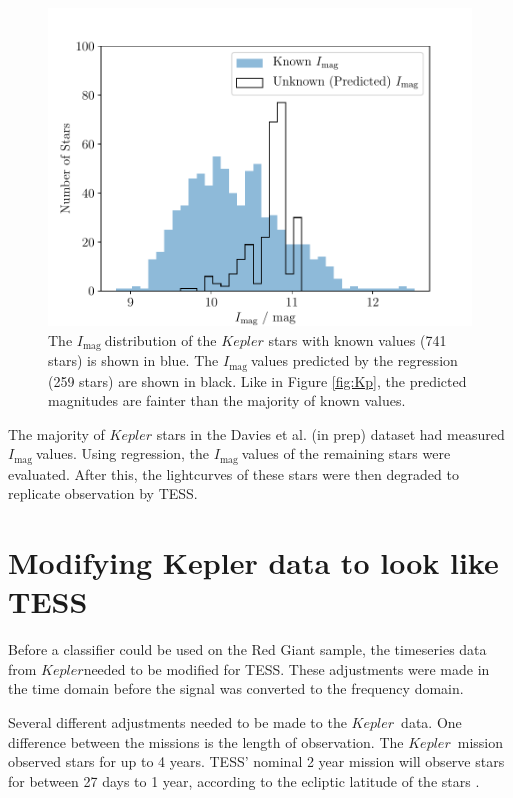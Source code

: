 \documentclass[a4paper,fleqn,usenatbib,useAMS]{mnras}
\newcommand{\kep}{\ensuremath{Kepler}\:}
\newcommand{\imag}{\ensuremath{I_{\textrm{mag}}\:}}
\begin{document}
\begin{figure}
	\centering
	\includegraphics[scale=0.5]{Plot3_Imag_trained_distribution}
	\caption{The \imag distribution of the $Kepler$ stars with known values (741 stars) is shown in blue. The \imag values predicted by the regression (259 stars) are shown in black. Like in Figure \ref{fig:Kp}, the predicted magnitudes are fainter than the majority of known values.}	
	\label{fig:imag train}
\end{figure}

The majority of $Kepler$ stars in the Davies et al. (in prep) dataset had measured \imag values. Using regression, the \imag values of the remaining stars were evaluated. After this, the lightcurves of these stars were then degraded to replicate observation by TESS.


\section{Modifying Kepler data to look like TESS}
\label{sect: tess-like}

Before a classifier could be used on the Red Giant sample, the timeseries data from \kep needed to be modified for TESS. These adjustments were made in the time domain before the signal was converted to the frequency domain.

Several different adjustments needed to be made to the \kep \ data. One difference between the missions is the length of observation. The \kep \ mission observed stars for up to 4 years. TESS' nominal 2 year mission will observe stars for between 27 days to 1 year, according to the ecliptic latitude of the stars \citep{ricker_transiting_2014}.
\end{document}
